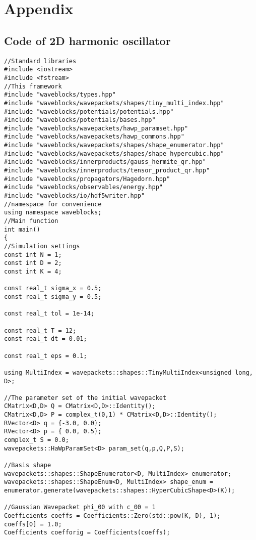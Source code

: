 \chapter{Appendix}

\section{Code of 2D harmonic oscillator}
\begin{lstlisting}
//Standard libraries
#include <iostream>
#include <fstream>
//This framework
#include "waveblocks/types.hpp"
#include "waveblocks/wavepackets/shapes/tiny_multi_index.hpp"
#include "waveblocks/potentials/potentials.hpp"
#include "waveblocks/potentials/bases.hpp"
#include "waveblocks/wavepackets/hawp_paramset.hpp"
#include "waveblocks/wavepackets/hawp_commons.hpp"
#include "waveblocks/wavepackets/shapes/shape_enumerator.hpp"
#include "waveblocks/wavepackets/shapes/shape_hypercubic.hpp"
#include "waveblocks/innerproducts/gauss_hermite_qr.hpp"
#include "waveblocks/innerproducts/tensor_product_qr.hpp"
#include "waveblocks/propagators/Hagedorn.hpp"
#include "waveblocks/observables/energy.hpp"
#include "waveblocks/io/hdf5writer.hpp"
//namespace for convenience
using namespace waveblocks;
//Main function
int main()
{
//Simulation settings
const int N = 1;
const int D = 2;
const int K = 4;

const real_t sigma_x = 0.5;
const real_t sigma_y = 0.5;

const real_t tol = 1e-14;

const real_t T = 12;
const real_t dt = 0.01;

const real_t eps = 0.1;

using MultiIndex = wavepackets::shapes::TinyMultiIndex<unsigned long, D>;

//The parameter set of the initial wavepacket
CMatrix<D,D> Q = CMatrix<D,D>::Identity();
CMatrix<D,D> P = complex_t(0,1) * CMatrix<D,D>::Identity();
RVector<D> q = {-3.0, 0.0};
RVector<D> p = { 0.0, 0.5};
complex_t S = 0.0;
wavepackets::HaWpParamSet<D> param_set(q,p,Q,P,S);

//Basis shape
wavepackets::shapes::ShapeEnumerator<D, MultiIndex> enumerator;
wavepackets::shapes::ShapeEnum<D, MultiIndex> shape_enum = enumerator.generate(wavepackets::shapes::HyperCubicShape<D>(K));

//Gaussian Wavepacket phi_00 with c_00 = 1
Coefficients coeffs = Coefficients::Zero(std::pow(K, D), 1);
coeffs[0] = 1.0;
Coefficients coefforig = Coefficients(coeffs);


\end{lstlisting}
